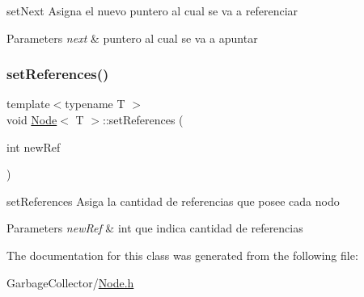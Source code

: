 set\+Next Asigna el nuevo puntero al cual se va a referenciar 


\begin{DoxyParams}{Parameters}
{\em next} & puntero al cual se va a apuntar \\
\hline
\end{DoxyParams}
\mbox{\label{class_node_a77ef6ecf6e4679e1f2b6ba6793df00e1}} 
\subsubsection{\texorpdfstring{set\+References()}{setReferences()}}
{\footnotesize\ttfamily template$<$typename T $>$ \\
void \hyperlink{class_node}{Node}$<$ T $>$\+::set\+References (\begin{DoxyParamCaption}\item[{int}]{new\+Ref }\end{DoxyParamCaption})}



set\+References Asiga la cantidad de referencias que posee cada nodo 


\begin{DoxyParams}{Parameters}
{\em new\+Ref} & int que indica cantidad de referencias \\
\hline
\end{DoxyParams}


The documentation for this class was generated from the following file\+:\begin{DoxyCompactItemize}
\item 
Garbage\+Collector/\hyperlink{_node_8h}{Node.\+h}\end{DoxyCompactItemize}
